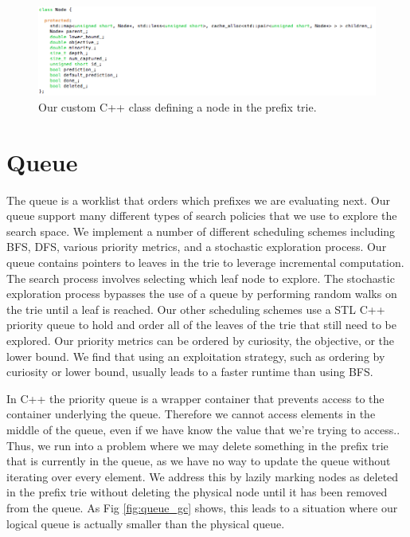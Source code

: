 \begin{figure}[t!]
\begin{center}
\includegraphics[width=\textwidth]{figs/cache_node.png}
\end{center}
\caption{Our custom C++ class defining a node in the prefix trie.}
\label{fig:cache_node}
\end{figure}

\section{Queue}\label{sec:queue}
The queue is a worklist that orders which prefixes we are evaluating next.
Our queue support many different types of search policies that we use to explore the search space.
We implement a number of different scheduling schemes including BFS, DFS, various priority metrics, and a stochastic exploration process.
Our queue contains pointers to leaves in the trie to leverage incremental computation.
The search process involves selecting which leaf node to explore.
The stochastic exploration process bypasses the use of a queue by performing random walks on the trie until a leaf is reached.
Our other scheduling schemes use a STL C++ priority queue to hold and order all of the leaves of the trie that still need to be explored.
Our priority metrics can be ordered by curiosity, the objective, or the lower bound.
We find that using an exploitation strategy, such as ordering by curiosity or lower bound, usually leads to a faster runtime than using BFS.

In C++ the priority queue is a wrapper container that prevents access to the container underlying the queue.
Therefore we cannot access elements in the middle of the queue, even if we have know the value that we're trying to access..
Thus, we run into a problem where we may delete something in the prefix trie that is currently in the queue, as we have no way to update the queue without iterating over every element.
We address this by lazily marking nodes as deleted in the prefix trie without deleting the physical node until it has been removed from the queue.
As Fig \ref{fig:queue_gc} shows, this leads to a situation where our logical queue is actually smaller than the physical queue.

